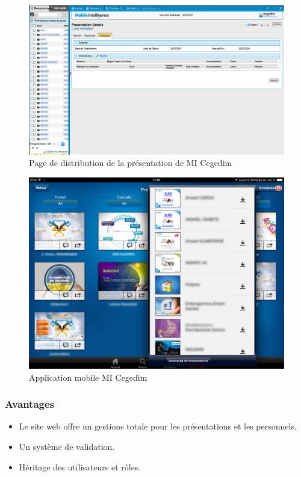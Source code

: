 \documentclass[12pt, ChapStyle1, oneside]{./Styles/Dea_Gsm}
\begin{document}
\begin{figure}[H]
    \centering
    \includegraphics[width=5.5in]{cegedim/web4}
    \caption{Page de distribution de la présentation de MI Cegedim}
    \label{Scrum}
\end{figure}

\begin{figure}[H]
    \centering
    \includegraphics[width=5.5in]{cegedim/app2}
    \caption{Application mobile MI Cegedim}
    \label{Scrum}
\end{figure}

\subsubsection{Avantages}
\begin{itemize}
  \item Le site web offre un gestions totale pour les présentations et les personnels.
  \item Un système de validation.
  \item Héritage des utilisateurs et rôles.
\end{itemize}
\end{document}
